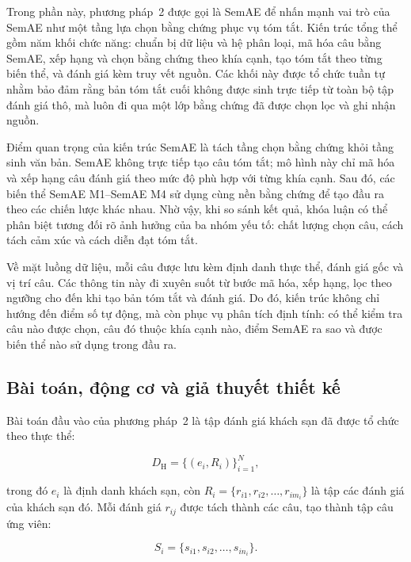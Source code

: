 Trong phần này, phương pháp~2 được gọi là SemAE để nhấn mạnh vai trò của SemAE như một tầng lựa chọn bằng chứng phục vụ tóm tắt. Kiến trúc tổng thể gồm năm khối chức năng: chuẩn bị dữ liệu và hệ phân loại, mã hóa câu bằng SemAE, xếp hạng và chọn bằng chứng theo khía cạnh, tạo tóm tắt theo từng biến thể, và đánh giá kèm truy vết nguồn. Các khối này được tổ chức tuần tự nhằm bảo đảm rằng bản tóm tắt cuối không được sinh trực tiếp từ toàn bộ tập đánh giá thô, mà luôn đi qua một lớp bằng chứng đã được chọn lọc và ghi nhận nguồn.

Điểm quan trọng của kiến trúc SemAE là tách tầng chọn bằng chứng khỏi tầng sinh văn bản. SemAE không trực tiếp tạo câu tóm tắt; mô hình này chỉ mã hóa và xếp hạng câu đánh giá theo mức độ phù hợp với từng khía cạnh. Sau đó, các biến thể SemAE M1--SemAE M4 sử dụng cùng nền bằng chứng để tạo đầu ra theo các chiến lược khác nhau. Nhờ vậy, khi so sánh kết quả, khóa luận có thể phân biệt tương đối rõ ảnh hưởng của ba nhóm yếu tố: chất lượng chọn câu, cách tách cảm xúc và cách diễn đạt tóm tắt.

Về mặt luồng dữ liệu, mỗi câu được lưu kèm định danh thực thể, đánh giá gốc và vị trí câu. Các thông tin này đi xuyên suốt từ bước mã hóa, xếp hạng, lọc theo ngưỡng cho đến khi tạo bản tóm tắt và đánh giá. Do đó, kiến trúc không chỉ hướng đến điểm số tự động, mà còn phục vụ phân tích định tính: có thể kiểm tra câu nào được chọn, câu đó thuộc khía cạnh nào, điểm SemAE ra sao và được biến thể nào sử dụng trong đầu ra.

\subsection{Bài toán, động cơ và giả thuyết thiết kế}
\label{subsec:method2-problem-motivation}

Bài toán đầu vào của phương pháp~2 là tập đánh giá khách sạn đã được tổ chức theo thực thể:

\begin{equation}
D_{\mathrm{H}}=\{(e_i, R_i)\}_{i=1}^{N},
\label{eq:method2-input-dataset}
\end{equation}

trong đó \(e_i\) là định danh khách sạn, còn \(R_i=\{r_{i1}, r_{i2}, \ldots, r_{im_i}\}\) là tập các đánh giá của khách sạn đó. Mỗi đánh giá \(r_{ij}\) được tách thành các câu, tạo thành tập câu ứng viên:

\begin{equation}
S_i=\{s_{i1},s_{i2},\ldots,s_{in_i}\}.
\label{eq:method2-sentence-set}
\end{equation}

